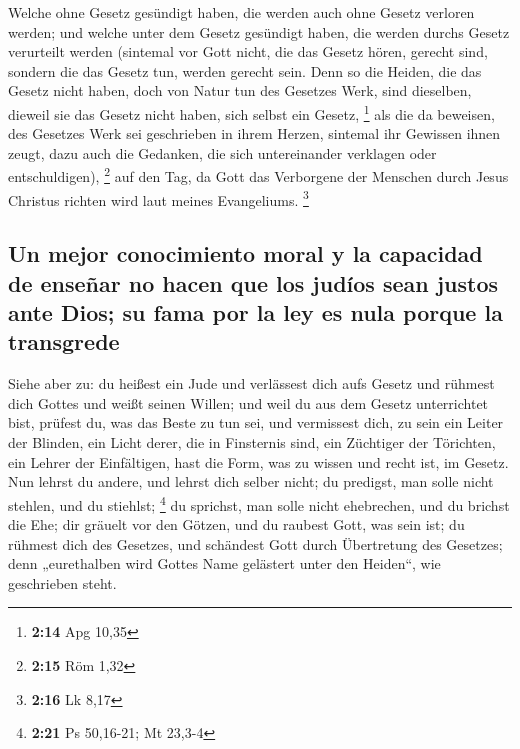  Welche ohne Gesetz gesündigt haben, die werden auch ohne
Gesetz verloren werden; und welche unter dem Gesetz gesündigt haben, die
werden durchs Gesetz verurteilt werden  (sintemal vor
Gott nicht, die das Gesetz hören, gerecht sind, sondern die das Gesetz
tun, werden gerecht sein.  Denn so die Heiden, die das
Gesetz nicht haben, doch von Natur tun des Gesetzes Werk, sind
dieselben, dieweil sie das Gesetz nicht haben, sich selbst ein Gesetz,
\footnote{\textbf{2:14} Apg 10,35}  als die da beweisen,
des Gesetzes Werk sei geschrieben in ihrem Herzen, sintemal ihr Gewissen
ihnen zeugt, dazu auch die Gedanken, die sich untereinander verklagen
oder entschuldigen), \footnote{\textbf{2:15} Röm 1,32} 
auf den Tag, da Gott das Verborgene der Menschen durch Jesus Christus
richten wird laut meines Evangeliums. \footnote{\textbf{2:16} Lk 8,17}

\hypertarget{un-mejor-conocimiento-moral-y-la-capacidad-de-enseuxf1ar-no-hacen-que-los-juduxedos-sean-justos-ante-dios-su-fama-por-la-ley-es-nula-porque-la-transgrede}{%
\subsection{Un mejor conocimiento moral y la capacidad de enseñar no
hacen que los judíos sean justos ante Dios; su fama por la ley es nula
porque la
transgrede}\label{un-mejor-conocimiento-moral-y-la-capacidad-de-enseuxf1ar-no-hacen-que-los-juduxedos-sean-justos-ante-dios-su-fama-por-la-ley-es-nula-porque-la-transgrede}}

 Siehe aber zu: du heißest ein Jude und verlässest dich
aufs Gesetz und rühmest dich Gottes  und weißt seinen
Willen; und weil du aus dem Gesetz unterrichtet bist, prüfest du, was
das Beste zu tun sei,  und vermissest dich, zu sein ein
Leiter der Blinden, ein Licht derer, die in Finsternis sind,
 ein Züchtiger der Törichten, ein Lehrer der Einfältigen,
hast die Form, was zu wissen und recht ist, im Gesetz. 
Nun lehrst du andere, und lehrst dich selber nicht; du predigst, man
solle nicht stehlen, und du stiehlst; \footnote{\textbf{2:21} Ps
  50,16-21; Mt 23,3-4}  du sprichst, man solle nicht
ehebrechen, und du brichst die Ehe; dir gräuelt vor den Götzen, und du
raubest Gott, was sein ist;  du rühmest dich des
Gesetzes, und schändest Gott durch Übertretung des Gesetzes;
 denn „eurethalben wird Gottes Name gelästert unter den
Heiden``, wie geschrieben steht.

